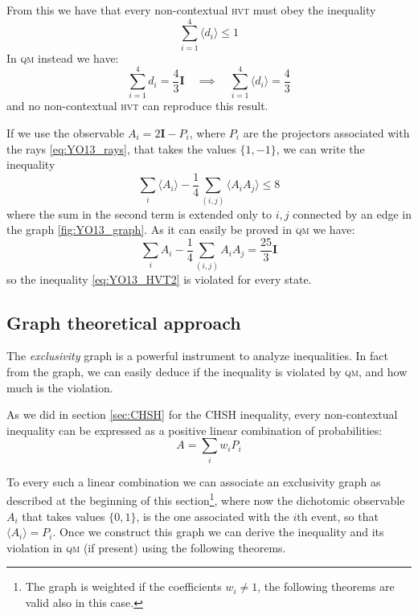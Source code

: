 \documentclass[a4paper]{article}
\newcommand{\acron}[1]{\textsc{#1}}
\newcommand{\HVT}{\acron{hvt}}
\newcommand{\QM}{\acron{qm}}
\newcommand{\I}{\mathbf{I}}
\theoremstyle{definition}
\begin{document}
From this we have that every non-contextual \HVT{} must obey the inequality
\begin{equation}
    \sum_{i=1}^4 \langle{d_i}\rangle \le 1
    \label{eq:YO13_HVT}
\end{equation}
In \QM{} instead we have:
\begin{equation}
    \sum_{i=1}^4 d_i = \frac{4}{3}\I \quad \implies \quad
    \sum_{i=1}^4 \langle{d_i}\rangle = \frac{4}{3} 
    \label{eq:YO13_QM}
\end{equation}
and no non-contextual \HVT{} can reproduce this result.

If we use the observable $A_i = 2\I - P_i$, where $P_i$ are the
projectors associated with the rays \eqref{eq:YO13_rays}, that takes the values
$\{1,-1\}$, we can write the inequality
\begin{equation}
    \sum_i \langle{A_i}\rangle - \frac{1}{4} \sum_{(i,j)} \langle{A_i A_j}\rangle \le 8
    \label{eq:YO13_HVT2}
\end{equation}
where the sum in the second term is extended only to $i,j$ connected by an edge
in the graph \ref{fig:YO13_graph}.
As it can easily be proved in \QM{} we have:
\begin{equation}
    \sum_i A_i - \frac{1}{4} \sum_{(i,j)} A_i A_j = \frac{25}{3} \I
    \label{eq:YO13_QM2}
\end{equation}
so the inequality \eqref{eq:YO13_HVT2} is violated for every state.

\subsection{Graph theoretical approach}
The \emph{exclusivity} graph is a powerful instrument to
analyze inequalities.
In fact from the graph, we can easily deduce if the inequality is
violated by \QM{}, and how much is the violation.

As we did in section \ref{sec:CHSH} for the \acron{CHSH} inequality, every
non-contextual inequality can be expressed as a positive linear combination of
probabilities:
\begin{equation}
    A = \sum_i w_i P_i
    \label{eq:prob_ncineq}
\end{equation}

To every such a linear combination we can associate an exclusivity graph as
described at the beginning of this section\footnote{The graph is
weighted if the coefficients $w_i \neq 1$, the following theorems are valid
also in this case.}, where now the dichotomic observable $A_i$ that takes
values $\{0,1\}$, is the one associated with the $i$th event, so that
$\langle{A_i}\rangle = P_i$. %
Once we construct this graph we can derive the inequality and its violation in
\QM{} (if present) using the following theorems.
\end{document}
